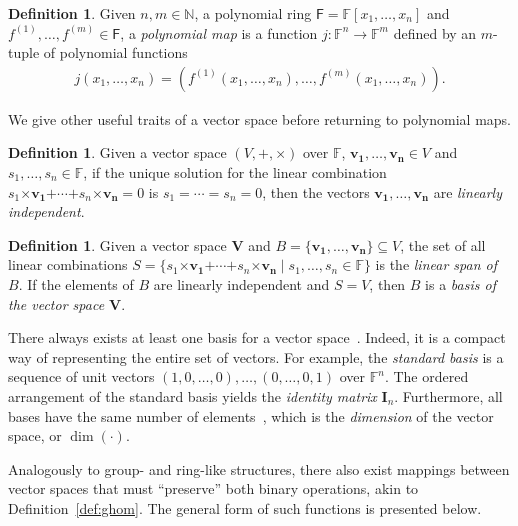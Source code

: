 \documentclass[12pt, a4paper, oneside]{memoir}
\theoremstyle{definition}
\newtheorem{definition}[theorem]{Definition}
\begin{document}
\begin{definition}\label{def:polymap}
  Given $n, m \in \mathbb{N}$, a polynomial ring $\mathsf{F} = \mathbb{F}[x_{1}, \dots, x_{n}]$ and $f^{(1)}, \dots, f^{(m)} \in \mathsf{F}$, a \emph{polynomial map} is a function $j : \mathbb{F}^{n} \to \mathbb{F}^{m}$ defined by an $m$-tuple of polynomial functions
  \begin{align}
    j(x_{1}, \dots, x_{n}) = (f^{(1)}(x_{1}, \dots, x_{n}), \dots, f^{(m)}(x_{1}, \dots, x_{n})).
  \end{align}
\end{definition}

We give other useful traits of a vector space before returning to polynomial maps.

\begin{definition}
  Given a vector space $(V, \bm{+}, \bm{\times})$ over $\mathbb{F}$, $\mathbf{v_{1}}, \dots, \mathbf{v_{n}} \in V$ and $s_{1}, \dots, s_{n} \in \mathbb{F}$, if the unique solution for the linear combination $s_{1} \bm{\times} \mathbf{v_{1}} \bm{+} \cdots \bm{+} s_{n} \bm{\times} \mathbf{v_{n}} = 0$ is $s_{1} = \cdots = s_{n} = 0$, then the vectors $\mathbf{v_{1}}, \dots, \mathbf{v_{n}}$ are \emph{linearly independent}.
\end{definition}

\begin{definition}
  Given a vector space $\mathbf{V}$ and $B = \{\mathbf{v_{1}}, \dots, \mathbf{v_{n}}\} \subseteq V$, the set of all linear combinations $S = \{ s_{1} \bm{\times} \mathbf{v_{1}} \bm{+} \cdots \bm{+} s_{n} \bm{\times} \mathbf{v_{n}} \mid s_{1}, \dots, s_{n} \in \mathbb{F} \}$ is the \emph{linear span of $B$}. If the elements of $B$ are linearly independent and $S = V$, then $B$ is a \emph{basis of the vector space $\mathbf{V}$}.
\end{definition}

There always exists at least one basis for a vector space~\cite[p.~409, Prop.~1]{Dummit:2003}. Indeed, it is a compact way of representing the entire set of vectors. For example, the \emph{standard basis} is a sequence of unit vectors $(1, 0, \dots, 0), \dots, (0, \dots, 0, 1)$ over $\mathbb{F}^{n}$. The ordered arrangement of the standard basis yields the \emph{identity matrix} $\mathbf{I}_{n}$. Furthermore, all bases have the same number of elements~\cite[p.~411, Cor.~4]{Dummit:2003}, which is the \emph{dimension} of the vector space, or $\dim(\cdot)$. 

Analogously to group- and ring-like structures, there also exist mappings between vector spaces that must ``preserve'' both binary operations, akin to Definition~\ref{def:ghom}. The general form of such functions is presented below.
\end{document}

